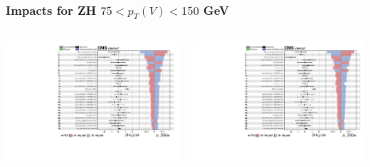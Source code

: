 \documentclass{beamer}
\newcommand{\backupend}{
  \addtocounter{framenumbervorappendix}{-\value{framenumber}}
  \addtocounter{framenumber}{\value{framenumbervorappendix}}
}
\begin{document}
\begin{frame}
  \frametitle{Impacts for ZH $75 < p_T(V) < 150$ GeV}
  \centering
  \begin{columns}
    \begin{column}{0.5\linewidth}
      \includegraphics[width=0.85\linewidth,page=1]{figures/impacts/impacts_r_zhlow.pdf}
    \end{column}
    \begin{column}{0.5\linewidth}
      \includegraphics[width=0.85\linewidth,page=2]{figures/impacts/impacts_r_zhlow.pdf}
    \end{column}
  \end{columns}
\end{frame}


\backupend
\end{document}
